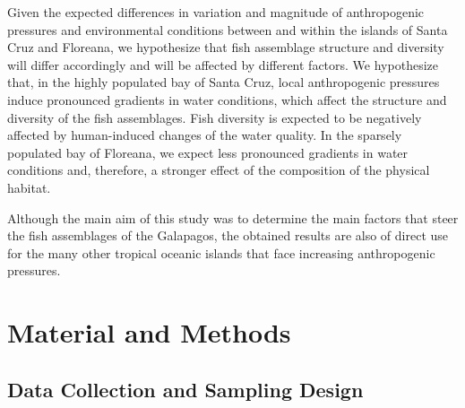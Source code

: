 \documentclass[jmse,article,accept,moreauthors,pdftex]{Definitions/mdpi}
\begin{document}
Given the expected differences in variation and magnitude of anthropogenic pressures and environmental conditions between and within the islands of Santa Cruz and Floreana, we hypothesize that fish assemblage structure and diversity will differ accordingly and will be affected by different factors. We hypothesize that, in the highly populated bay of Santa Cruz, local anthropogenic pressures induce pronounced gradients in water conditions, which affect the structure and diversity of the fish assemblages. Fish diversity is expected to be negatively affected by human-induced changes of the water quality. In the sparsely populated bay of Floreana, we expect less pronounced gradients in water conditions and, therefore, a stronger effect of the composition of the physical habitat. 

Although the main aim of this study was to determine the main factors that steer the fish assemblages of the Galapagos, the obtained results are also of direct use for the many other tropical oceanic islands that face increasing anthropogenic pressures. 



%   
\section{Material and Methods}
\label{MaterialandMethodsMedianMedia}

\subsection{Data Collection and Sampling Design}
\end{document}
